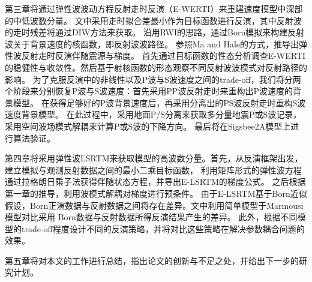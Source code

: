 第三章将通过弹性波波动方程反射走时反演（E-WERTI）来重建速度模型中深部的中低波数分量。
文中采用走时拟合差最小作为目标函数进行反演，其中反射波的走时残差将通过DIW方法来获取。
沿用RWI的思路，通过Born模拟来构建反射波关于背景速度的核函数，即反射波波路径。
参照Ma and Hale\cite{ma2013}的方式，推导出弹性波反射走时反演伴随震源与梯度。
首先通过目标函数的性态分析调查E-WERTI的稳健性与收敛性。然后基于射核函数的形态观察不同反射波波模式对反射路径的影响。
为了克服反演中的非线性以及P波与S波速度之间的trade-off，我们将分两个阶段来分别恢复P波与S波速度：首先采用PP波反射走时来重构出P波速度的背景模型。
在获得足够好的P波背景速度后，再采用分离出的PS波反射走时重构S波速度背景模型。
在此过程中，采用地面P/S分离来获取多分量地震P或S波记录，采用空间波场模式解耦来计算P或S波的下降方向。
最后将在Sigsbee2A模型上进行算法验证。

第四章将采用弹性波LSRTM来获取模型的高波数分量。首先，从反演框架出发，建立模拟与观测反射数据之间的最小二乘目标函数，
利用矩阵形式的弹性波方程通过拉格朗日乘子法获得伴随状态方程，并导出E-LSRTM的梯度公式。
之后根据第一章的推导，利用波模式解耦对梯度进行预条件。
由于E-LSRTM基于Born近似假设，Born正演数据与反射数据之间将存在差异。文中利用简单模型于Marmousi模型对比采用
Born数据与反射数据所得反演结果产生的差异。
此外，根据不同模型的trade-off程度设计不同的反演策略，并将对比这些策略在解决参数耦合问题的效果。

第五章将对本文的工作进行总结，指出论文的创新与不足之处，并给出下一步的研究计划。
